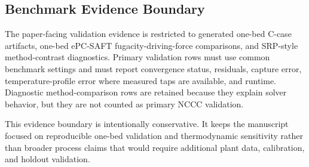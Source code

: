     \subsection{Benchmark Evidence Boundary}
        The paper-facing validation evidence is restricted to generated one-bed C-case artifacts, one-bed ePC-SAFT fugacity-driving-force comparisons, and SRP-style method-contrast diagnostics. Primary validation rows must use common benchmark settings and must report convergence status, residuals, capture error, temperature-profile error where measured taps are available, and runtime. Diagnostic method-comparison rows are retained because they explain solver behavior, but they are not counted as primary NCCC validation.

        This evidence boundary is intentionally conservative. It keeps the manuscript focused on reproducible one-bed validation and thermodynamic sensitivity rather than broader process claims that would require additional plant data, calibration, and holdout validation.
